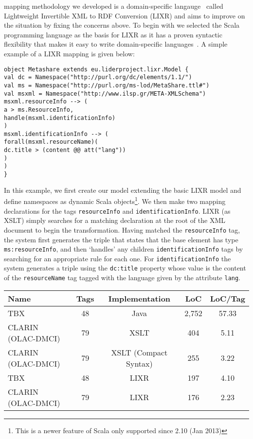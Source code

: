 \documentclass{llncs}
\begin{document}
{{mapping methodology we developed is a domain-specific
langauge~\cite{fowler2010domain} called Lightweight Invertible XML to RDF
Conversion (LIXR) and aims to improve on the situation by fixing the concerns
above.
To begin with we selected the Scala programming language as the basis for LIXR
as it has a proven syntactic flexibility that makes it easy to write
domain-specific languages~\cite{wampler2008programming}. A simple example of a
LIXR mapping is given below:
{\footnotesize
\begin{verbatim}
object Metashare extends eu.liderproject.lixr.Model {
val dc = Namespace("http://purl.org/dc/elements/1.1/")
val ms = Namespace("http://purl.org/ms-lod/MetaShare.ttl#")
val msxml = Namespace("http://www.ilsp.gr/META-XMLSchema")
msxml.resourceInfo --> (
a > ms.ResourceInfo,
handle(msxml.identificationInfo)
)
msxml.identificationInfo --> (
forall(msxml.resourceName)(
dc.title > (content @@ att("lang"))
)
)
}
\end{verbatim}}
In this example, we first create our model extending the basic LIXR model and
define namespaces as dynamic Scala objects\footnote{This is a newer feature of
Scala only supported since 2.10 (Jan 2013)}. We then make two mapping
declarations for the tags {\tt resourceInfo} and {\tt identificationInfo}. LIXR (as
XSLT) simply searches for a matching declaration at the root of the XML document
to begin the transformation. Having matched the {\tt resourceInfo} tag, the system
first generates the triple that states that the base element has type
{\tt ms:resourceInfo}, and then `handles' any children {\tt identificationInfo} tags by
searching for an appropriate rule for each one. For {\tt identificationInfo} the
system generates a triple using the {\tt dc:title} property whose value is the
content of the {\tt resourceName} tag tagged with the language given by the
attribute {\tt lang}.
\begin{table}
\begin{center}
\begin{tabular}{p{4cm}|cccc}
Name & Tags & Implementation & LoC & LoC/Tag \\
\hline
TBX & 48 & Java & 2,752 & 57.33 \\
CLARIN (OLAC-DMCI) & 79 & XSLT & 404 & 5.11 \\
CLARIN (OLAC-DMCI) & 79 & XSLT (Compact Syntax) & 255 & 3.22 \\
\hline
TBX & 48 & LIXR & 197 & 4.10 \\
CLARIN (OLAC-DMCI) & 79 & LIXR & 176 & 2.23 \\

\end{tabular}
\end{center}
\end{table}}}
\end{document}
